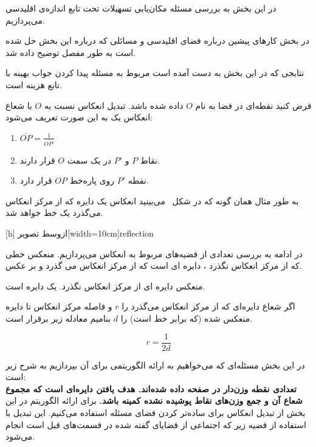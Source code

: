 در این بخش به بررسی مسئله مکان‌یابی تسهیلات تحت تابع اندازه‌ی اقلیدسی می‌پردازیم.

در بخش کارهای پیشین درباره فضای اقلیدسی و مسائلی که درباره این بخش حل شده است به طور مفصل توضیح داده شد. 

نتایجی که در این بخش به دست آمده است مربوط به مسئله پیدا کردن جواب بهینه با تابع هزینه است. 

فرض کنید نقطه‌ای در فضا به نام $O$ داده شده باشد. تبدیل انعکاس  نسبت به $O$ با شعاع انعکاس یک به این صورت تعریف می‌شود:
\begin{enumerate}
\item
$
\overline{OP}=\frac{1}{\overline{OP'}}
$ 
\item
نقاط $ P $ و $ P'$ در یک سمت $O$ قرار دارند.
\item
نقطه $P'$ روی پاره‌خط $OP$ قرار دارد.
\end{enumerate}
به طور مثال همان‌ گونه که در شکل~ می‌بینید انعکاس یک دایره که از مرکز انعکاس می‌گذرد یک خط خواهد شد.

[h]
‌ازوسط
‌تصویر[width=10cm]{reflection}

در ادامه به بررسی تعدادی از قضیه‌های مربوط به انعکاس می‌پردازیم.
منعکس خطی که از مرکز انعکاس نگذرد ، دایره ای است که از مرکز انعکاس می گذرد و بر عکس.

منعکس دایره ای از مرکز انعکاس نگذرد. یک دایره است.

اگر شعاع دایره‌ای که از مرکز انعکاس می‌گذرد را $r$ و فاصله مرکز انعکاس تا دایره منعکس شده (که برابر خط است) را $d$ بنامیم معادله زیر برقرار است.

$$
r=\frac{1}{2d}
$$


در این بخش مسئله‌ای که می‌خواهیم به ارائه الگوریتمی برای آن بپردازیم به شرح زیر است:\\

\textbf{
تعدادی نقطه وزن‌دار در صفحه داده شده‌اند. هدف یافتن دایره‌ای است که مجموع شعاع آن و جمع وزن‌های نقاط پوشیده نشده کمینه باشد.
}
برای ارائه الگوریتم در این بخش از تبدیل انعکاس برای ساده‌تر کردن فضای مسئله استفاده می‌کنیم. این تبدیل با استفاده از قضیه زیر که اجتماعی از قضایای گفته شده در قسمت‌های قبل است انجام می‌شود.

